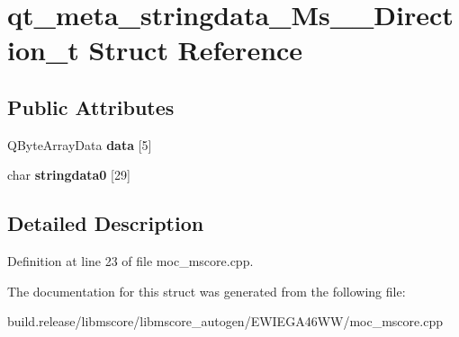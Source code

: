 \hypertarget{structqt__meta__stringdata___ms_____direction__t}{}\section{qt\+\_\+meta\+\_\+stringdata\+\_\+\+Ms\+\_\+\+\_\+\+Direction\+\_\+t Struct Reference}
\label{structqt__meta__stringdata___ms_____direction__t}
\subsection*{Public Attributes}
\begin{DoxyCompactItemize}
\item 
\mbox{\label{structqt__meta__stringdata___ms_____direction__t_ac672565f0deb00531a5491589078d241}} 
Q\+Byte\+Array\+Data {\bfseries data} \mbox{[}5\mbox{]}
\item 
\mbox{\label{structqt__meta__stringdata___ms_____direction__t_a3a5edfdae79a44e0fd8c53bdb6c8371f}} 
char {\bfseries stringdata0} \mbox{[}29\mbox{]}
\end{DoxyCompactItemize}


\subsection{Detailed Description}


Definition at line 23 of file moc\+\_\+mscore.\+cpp.



The documentation for this struct was generated from the following file\+:\begin{DoxyCompactItemize}
\item 
build.\+release/libmscore/libmscore\+\_\+autogen/\+E\+W\+I\+E\+G\+A46\+W\+W/moc\+\_\+mscore.\+cpp\end{DoxyCompactItemize}
